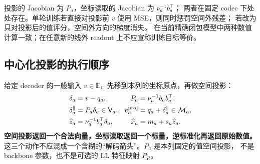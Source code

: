 \documentclass[11pt,UTF8,fontset=fandol]{ctexart}
\numberwithin{equation}{section}
\theoremstyle{definition}
\begin{document}
投影的 Jacobian 为 $P_a$，坐标读取的 Jacobian 为 $\nu_a^{-1}b_a^\top$；
两者在固定 codec 下处处存在。单轮训练若直接对投影前 $v$ 使用 MSE，则同时惩罚空间外残差；
若改为只对投影后的值评分，空间外方向的梯度消失。
在当前精确闭包模型中两种数值计算一致；在任意新的线外 readout 上不应宣称训练目标等价。

\subsection{中心化投影的执行顺序}
给定 decoder 的一般输入 $v\in\mathbb E$，先移到本列的坐标原点，再做空间投影：
\begin{equation}
 \begin{aligned}
  \delta_a&=v-q_a,&P_a&=\nu_a^{-1}b_ab_a^\top,\\
  \delta_a^{\parallel}&=P_a\delta_a\in\mathsf V_a,&
  e_a^{\rm proj}&=q_a+\delta_a^{\parallel}\in\mathcal M_a,\\
  \widehat z_a&=\nu_a^{-1}b_a^\top\delta_a,&
  \widehat x_a&=m_a+s_a\widehat z_a.
 \end{aligned}
 \label{v52:eq:projection-pipeline}
\end{equation}
\textbf{空间投影返回一个合法向量，坐标读取返回一个标量，逆标准化再返回原始数值。}
这三个动作不应混成一个含糊的“解码箭头”。$P_a$ 是本列固定的值空间投影，
不是 backbone 参数，也不是可选的 LL 特征映射 $P_R$。
\end{document}
